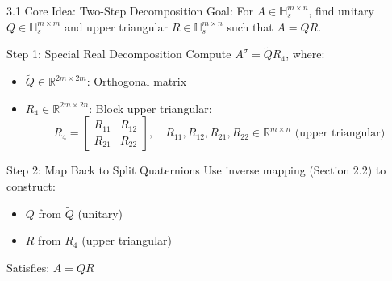 \documentclass{beamer}
\begin{document}
\begin{frame}{3.1 Core Idea: Two-Step Decomposition}
  Goal: For $A \in \mathbb{H}_s^{m \times n}$, find unitary $Q \in \mathbb{H}_s^{m \times m}$ and upper triangular $R \in \mathbb{H}_s^{m \times n}$ such that $A = QR$.

  \begin{block}{Step 1: Special Real Decomposition}
    Compute $A^\sigma = \tilde{Q} R_4$, where:
   \begin{itemize}
    \item $\tilde{Q} \in \mathbb{R}^{2m \times 2m}$: Orthogonal matrix\\
    \item $R_4 \in \mathbb{R}^{2m \times 2n}$: Block upper triangular:
      \[
      R_4 = \begin{bmatrix} R_{11} & R_{12} \\ R_{21} & R_{22} \end{bmatrix}, \quad R_{11},R_{12},R_{21},R_{22} \in \mathbb{R}^{m \times n} \text{ (upper triangular)}
      \]
   \end{itemize}
  \end{block}
  
  \begin{block}{Step 2: Map Back to Split Quaternions}
    Use inverse mapping (Section 2.2) to construct:
   \begin{itemize}
    \item $Q$ from $\tilde{Q}$ (unitary)
    \item $R$ from $R_4$ (upper triangular)
   \end{itemize}
    Satisfies: $A = QR$
  \end{block}
\end{frame}
\end{document}
